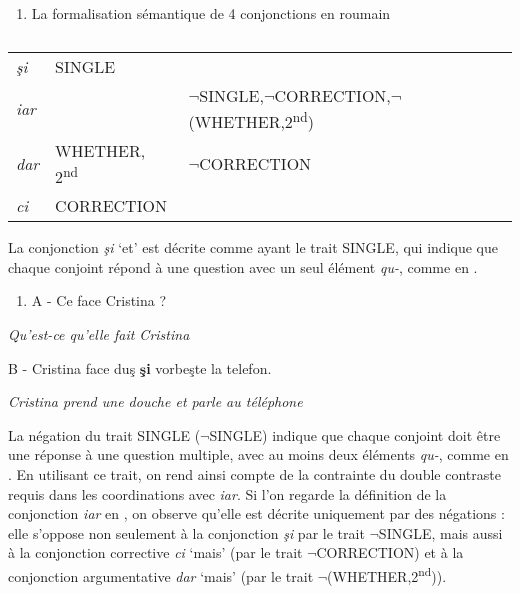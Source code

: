 \begin{enumerate}
\item   \label{bkm:Ref302028826}La formalisation sémantique de 4 conjonctions en roumain


\end{enumerate}

\begin{table}


\begin{tabular}{lll}

 {\itshape şi}\par & SINGLE & \\
 {\itshape iar}\par &  & ${\lnot}$SINGLE,${\lnot}$CORRECTION,${\lnot}$(WHETHER,2\textsuperscript{nd})\\
 {\itshape dar}\par & WHETHER, 2\textsuperscript{nd} & ${\lnot}$CORRECTION\\
 {\itshape ci}\par & CORRECTION & \\
\end{tabular}

\caption{}
\end{table}

La conjonction \textit{şi} `et' est décrite comme ayant le trait SINGLE, qui indique que chaque conjoint répond à une question avec un seul élément \textit{qu-}, comme en . 


\begin{enumerate}
\item \label{bkm:Ref302029219}A  - Ce face Cristina ?


\end{enumerate}
{\itshape
Qu'est-ce qu'elle fait Cristina}

  B  - Cristina face duş \textbf{şi} vorbeşte la telefon.

{\itshape
Cristina prend une douche et parle au téléphone} 

La négation du trait SINGLE (${\lnot}$SINGLE) indique que chaque conjoint doit être une réponse à une question multiple, avec au moins deux éléments \textit{qu-}, comme en . En utilisant ce trait, on rend ainsi compte de la contrainte du double contraste requis dans les coordinations avec \textit{iar}. Si l'on regarde la définition de la conjonction \textit{iar} en , on observe qu'elle est décrite uniquement par des négations : elle s'oppose non seulement à la conjonction \textit{şi} par le trait ${\lnot}$SINGLE, mais aussi à la conjonction corrective \textit{ci} `mais' (par le trait ${\lnot}$CORRECTION) et à la conjonction argumentative \textit{dar} `mais' (par le trait ${\lnot}$(WHETHER,2\textsuperscript{nd})).



